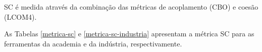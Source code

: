 SC é medida através da combinação das métricas de acoplamento (CBO) e coesão
(LCOM4).

As Tabelas \ref{metrica-sc} e \ref{metrica-sc-industria} apresentam a
métrica SC para as ferramentas da academia e da indústria, respectivamente.










